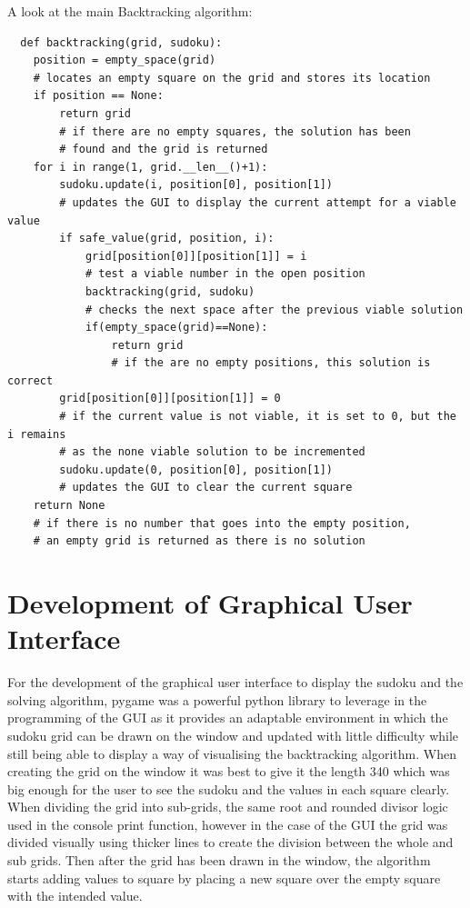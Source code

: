 \documentclass[]{final_report}
\begin{document}
A look at the main Backtracking algorithm:
\begin{verbatim}
  def backtracking(grid, sudoku):
    position = empty_space(grid)
    # locates an empty square on the grid and stores its location
    if position == None:
        return grid
        # if there are no empty squares, the solution has been 
        # found and the grid is returned
    for i in range(1, grid.__len__()+1):
        sudoku.update(i, position[0], position[1])
        # updates the GUI to display the current attempt for a viable value
        if safe_value(grid, position, i):
            grid[position[0]][position[1]] = i
            # test a viable number in the open position
            backtracking(grid, sudoku)
            # checks the next space after the previous viable solution
            if(empty_space(grid)==None):
                return grid
                # if the are no empty positions, this solution is correct
        grid[position[0]][position[1]] = 0
        # if the current value is not viable, it is set to 0, but the i remains
        # as the none viable solution to be incremented
        sudoku.update(0, position[0], position[1])
        # updates the GUI to clear the current square
    return None
    # if there is no number that goes into the empty position, 
    # an empty grid is returned as there is no solution
\end{verbatim}

\section{Development of Graphical User Interface}

For the development of the graphical user interface to display the sudoku and the solving algorithm, pygame was a powerful python library to leverage in the programming of the GUI as it provides an adaptable environment in which the sudoku grid can be drawn on the window and updated with little difficulty while still being able to display a way of visualising the backtracking algorithm. When creating the grid on the window it was best to give it the length 340 which was big enough for the user to see the sudoku and the values in each square clearly. When dividing the grid into sub-grids, the same root and rounded divisor logic used in the console print function, however in the case of the GUI the grid was divided visually using thicker lines to create the division between the whole and sub grids. Then after the grid has been drawn in the window, the algorithm starts adding values to square by placing a new square over the empty square with the intended value. 
\end{document}
